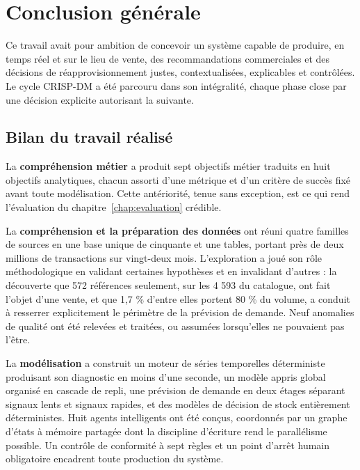 \chapter*{Conclusion générale}

Ce travail avait pour ambition de concevoir un système capable de produire, en temps réel et sur le lieu de vente, des recommandations commerciales et des décisions de réapprovisionnement justes, contextualisées, explicables et contrôlées. Le cycle CRISP-DM a été parcouru dans son intégralité, chaque phase close par une décision explicite autorisant la suivante.

\section*{Bilan du travail réalisé}

La \textbf{compréhension métier} a produit sept objectifs métier traduits en huit objectifs analytiques, chacun assorti d'une métrique et d'un critère de succès fixé avant toute modélisation. Cette antériorité, tenue sans exception, est ce qui rend l'évaluation du chapitre~\ref{chap:evaluation} crédible.

La \textbf{compréhension et la préparation des données} ont réuni quatre familles de sources en une base unique de cinquante et une tables, portant près de deux millions de transactions sur vingt-deux mois. L'exploration a joué son rôle méthodologique en validant certaines hypothèses et en invalidant d'autres : la découverte que 572 références seulement, sur les 4 593 du catalogue, ont fait l'objet d'une vente, et que 1,7 \% d'entre elles portent 80 \% du volume, a conduit à resserrer explicitement le périmètre de la prévision de demande. Neuf anomalies de qualité ont été relevées et traitées, ou assumées lorsqu'elles ne pouvaient pas l'être.

La \textbf{modélisation} a construit un moteur de séries temporelles déterministe produisant son diagnostic en moins d'une seconde, un modèle appris global organisé en cascade de repli, une prévision de demande en deux étages séparant signaux lents et signaux rapides, et des modèles de décision de stock entièrement déterministes. Huit agents intelligents ont été conçus, coordonnés par un graphe d'états à mémoire partagée dont la discipline d'écriture rend le parallélisme possible. Un contrôle de conformité à sept règles et un point d'arrêt humain obligatoire encadrent toute production du système.

